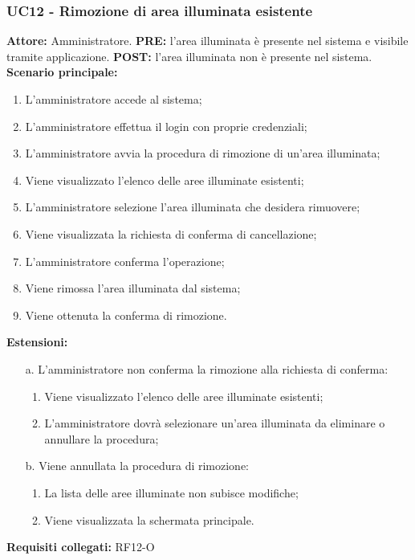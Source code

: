 \documentclass[a4paper, 12pt]{article}
\begin{document}
\subsubsection{UC12 - Rimozione di area illuminata esistente}
\textbf{Attore:} Amministratore.\newline
\textbf{PRE:} l'area illuminata è presente nel sistema e visibile tramite applicazione.\newline
\textbf{POST:} l'area illuminata non è presente nel sistema.\newline
\textbf{Scenario principale:}
\begin{enumerate}
    \item L'amministratore accede al sistema;
    \item L'amministratore effettua il login con proprie credenziali;
    \item L'amministratore avvia la procedura di rimozione di un'area illuminata;
    \item Viene visualizzato l'elenco delle aree illuminate esistenti;
    \item L'amministratore selezione l'area illuminata che desidera rimuovere;
    \item Viene visualizzata la richiesta di conferma di cancellazione;
    \item L'amministratore conferma l'operazione;
    \item Viene rimossa l'area illuminata dal sistema;
    \item Viene ottenuta la conferma di rimozione.
\end{enumerate}
\textbf{Estensioni:}
\begin{itemize}
    \item [a.] L'amministratore non conferma la rimozione alla richiesta di conferma:
    \begin{enumerate}
        \item Viene visualizzato l'elenco delle aree illuminate esistenti;
        \item L'amministratore dovrà selezionare un'area illuminata da eliminare o annullare la procedura;
    \end{enumerate}
    \item [b.] Viene annullata la procedura di rimozione:
    \begin{enumerate}
        \item La lista delle aree illuminate non subisce modifiche;
        \item Viene visualizzata la schermata principale.
    \end{enumerate}
\end{itemize}
\textbf{Requisiti collegati:} RF12-O\newline
\end{document}
